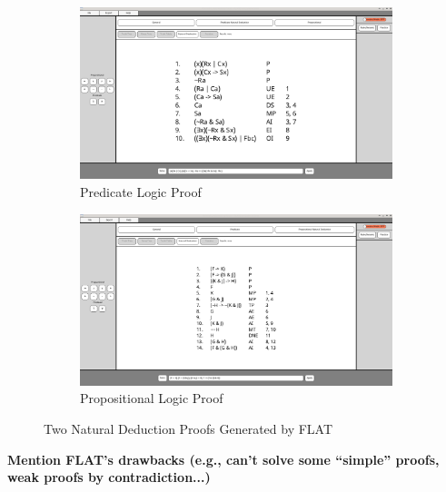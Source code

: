 \documentclass[ms]{uncgdissertationexp2}
\theoremstyle{plain}
\theoremstyle{definition}
\theoremstyle{remark}
\begin{document}
\begin{figure}[!ht]
	\centering
	\begin{subfigure}{.5\textwidth}
		\centering
        \includegraphics[width=0.9\linewidth]{flat1.png}
		\caption{Predicate Logic Proof}
		\label{fig:flat1}
	\end{subfigure}%
	\begin{subfigure}{.5\textwidth}
		\centering
		\includegraphics[width=0.9\linewidth]{flat2.png}
		\caption{Propositional Logic Proof}
		\label{fig:flat2}
	\end{subfigure}
	\caption{Two Natural Deduction Proofs Generated by FLAT}
	\label{fig:flatfigures}
\end{figure}

\textbf{Mention FLAT's drawbacks (e.g., can't solve some ``simple'' proofs, weak proofs by contradiction...)}
\end{document}
